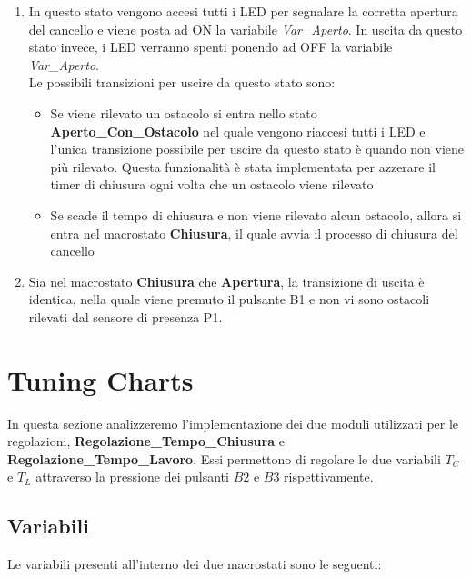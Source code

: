 \begin{enumerate}
                \item In questo stato vengono accesi tutti i LED per segnalare la corretta apertura del cancello e viene posta ad ON la variabile \textit{Var\_Aperto}. In uscita da questo stato invece, i LED verranno spenti ponendo ad OFF la variabile \textit{Var\_Aperto}. \\
                Le possibili transizioni per uscire da questo stato sono:
                
                \begin{itemize}
                    \item Se viene rilevato un ostacolo si entra nello stato \textbf{Aperto\_Con\_Ostacolo} nel quale vengono riaccesi tutti i LED e l'unica transizione possibile per uscire da questo stato è quando non viene più rilevato.
                    Questa funzionalità è stata implementata per azzerare il timer di chiusura ogni volta che un ostacolo viene rilevato
                    
                    \item Se scade il tempo di chiusura e non viene rilevato alcun ostacolo, allora si entra nel macrostato \textbf{Chiusura}, il quale avvia il processo di chiusura del cancello
                \end{itemize}
                
                \item Sia nel macrostato \textbf{Chiusura} che \textbf{Apertura}, la transizione di uscita è identica, nella quale viene premuto il pulsante B1 e non vi sono ostacoli rilevati dal sensore di presenza P1.
            \end{enumerate}


    \section{Tuning Charts}
        In questa sezione analizzeremo l'implementazione dei due moduli utilizzati per le regolazioni, \textbf{Regolazione\_Tempo\_Chiusura} e \textbf{Regolazione\_Tempo\_Lavoro}.
        Essi permettono di regolare le due variabili \textbf{$T_C$} e \textbf{$T_L$} attraverso la pressione dei pulsanti \textbf{$B2$} e \textbf{$B3$} rispettivamente.

        \subsection{Variabili}
            Le variabili presenti all'interno dei due macrostati sono le seguenti:
            
